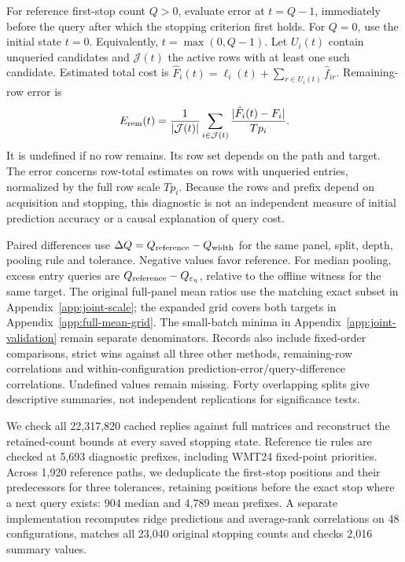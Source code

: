 For reference first-stop count $Q>0$, evaluate error at $t=Q-1$, immediately before the query after which the stopping criterion first holds. For $Q=0$, use the initial state $t=0$. Equivalently, $t=\max(0,Q-1)$. Let $U_i(t)$ contain unqueried candidates and $\mathcal J(t)$ the active rows with at least one such candidate. Estimated total cost is $\hat F_i(t)=\ell_i(t)+\sum_{r\in U_i(t)}\hat f_{ir}$. Remaining-row error is
\[
 E_{\rm rem}(t)=\frac{1}{|\mathcal J(t)|}\sum_{i\in\mathcal J(t)}\frac{|\hat F_i(t)-F_i|}{Tp_i}.
\]
It is undefined if no row remains. Its row set depends on the path and target. The error concerns row-total estimates on rows with unqueried entries, normalized by the full row scale $Tp_i$. Because the rows and prefix depend on acquisition and stopping, this diagnostic is not an independent measure of initial prediction accuracy or a causal explanation of query cost.

Paired differences use $\Delta Q=Q_{\rm reference}-Q_{\rm width}$ for the same panel, split, depth, pooling rule and tolerance. Negative values favor reference. For median pooling, excess entry queries are $Q_{\rm reference}-Q_{\varepsilon_\eta}$, relative to the offline witness for the same target. The original full-panel mean ratios use the matching exact subset in Appendix~\ref{app:joint-scale}; the expanded grid covers both targets in Appendix~\ref{app:full-mean-grid}. The small-batch minima in Appendix~\ref{app:joint-validation} remain separate denominators. Records also include fixed-order comparisons, strict wins against all three other methods, remaining-row correlations and within-configuration prediction-error/query-difference correlations. Undefined values remain missing. Forty overlapping splits give descriptive summaries, not independent replications for significance tests.

We check all 22,317,820 cached replies against full matrices and reconstruct the retained-count bounds at every saved stopping state. Reference tie rules are checked at 5,693 diagnostic prefixes, including WMT24 fixed-point priorities. Across 1,920 reference paths, we deduplicate the first-stop positions and their predecessors for three tolerances, retaining positions before the exact stop where a next query exists: 904 median and 4,789 mean prefixes. A separate implementation recomputes ridge predictions and average-rank correlations on 48 configurations, matches all 23,040 original stopping counts and checks 2,016 summary values.


